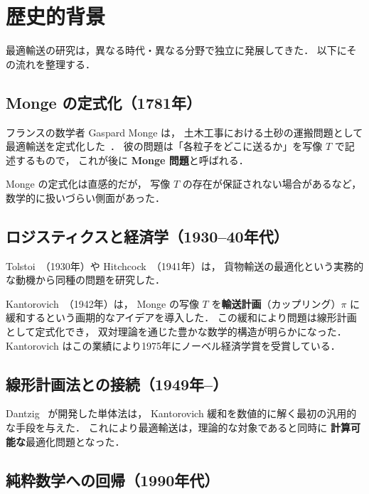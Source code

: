 \section{歴史的背景}\label{sec:history}

最適輸送の研究は，異なる時代・異なる分野で独立に発展してきた．
以下にその流れを整理する．

\subsection*{Monge の定式化（1781年）}

フランスの数学者 Gaspard Monge は，
土木工事における土砂の運搬問題として最適輸送を定式化した~\cite{Monge1781}．
彼の問題は「各粒子をどこに送るか」を写像 $T$ で記述するもので，
これが後に \textbf{Monge 問題}と呼ばれる．

Monge の定式化は直感的だが，
写像 $T$ の存在が保証されない場合があるなど，
数学的に扱いづらい側面があった．

\subsection*{ロジスティクスと経済学（1930--40年代）}

Tolstoi~\cite{Tolstoi1930}（1930年）や
Hitchcock~\cite{Hitchcock1941}（1941年）は，
貨物輸送の最適化という実務的な動機から同種の問題を研究した．

Kantorovich~\cite{Kantorovich1942}（1942年）は，
Monge の写像 $T$ を\textbf{輸送計画}（カップリング）$\pi$
に緩和するという画期的なアイデアを導入した．
この緩和により問題は線形計画として定式化でき，
双対理論を通じた豊かな数学的構造が明らかになった．
Kantorovich はこの業績により1975年にノーベル経済学賞を受賞している．

\subsection*{線形計画法との接続（1949年--）}

Dantzig~\cite{Dantzig1951} が開発した単体法は，
Kantorovich 緩和を数値的に解く最初の汎用的な手段を与えた．
これにより最適輸送は，理論的な対象であると同時に
\textbf{計算可能な}最適化問題となった．

\subsection*{純粋数学への回帰（1990年代）}

